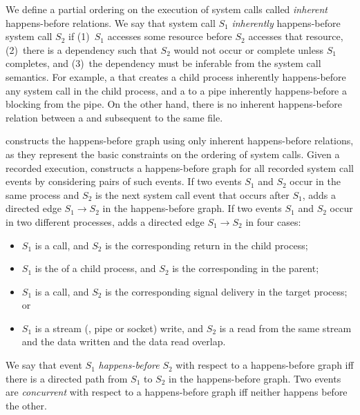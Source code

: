 We define a partial ordering on the execution of system calls called
\emph{inherent} happens-before relations.  We say that system call
$S_1$ \emph{inherently} happens-before system call $S_2$ if (1)~$S_1$
accesses some resource before $S_2$ accesses that resource, (2)~there
is a dependency such that $S_2$ would not occur or complete unless
$S_1$ completes, and (3)~the dependency must be inferable from the
system call semantics.  For example, a  that creates a child
process inherently happens-before any system call in the child
process, and a  to a pipe inherently happens-before 
a blocking  from the pipe.  On the other hand, there is no
inherent happens-before relation between a  and subsequent 
 to the same file.

\racepro constructs the happens-before graph using only inherent
happens-before relations, as they represent the basic constraints on
the ordering of system calls.  Given a recorded
execution, \racepro constructs a happens-before graph for all recorded
system call events by considering pairs of such events.  If two events
$S_1$ and $S_2$ occur in the same process and $S_2$ is the next
system call event that occurs after $S_1$, \racepro adds a directed edge
$S_1\rightarrow S_2$ in the happens-before graph.  If two events $S_1$
and $S_2$ occur in two different processes, \racepro adds a directed edge
$S_1\rightarrow S_2$ in four cases: 

\begin{itemize}
\item $S_1$ is a  call, and $S_2$ is the corresponding
   return in the child process;
\item $S_1$ is the  of a child process, and $S_2$ is the
  corresponding  in the parent;
\item $S_1$ is a  call, and $S_2$ is the corresponding signal
  delivery in the target process; or
\item $S_1$ is a stream (\eg, pipe or socket) write, and $S_2$ is a
  read from the same stream and the data written and the data read
  overlap.
\end{itemize}

We say that event $S_1$ \emph{happens-before} $S_2$ with respect to a
happens-before graph iff there is a directed path from $S_1$ to
$S_2$ in the happens-before graph.  Two events are \emph{concurrent}
with respect to a happens-before graph iff neither happens before
the other. 

